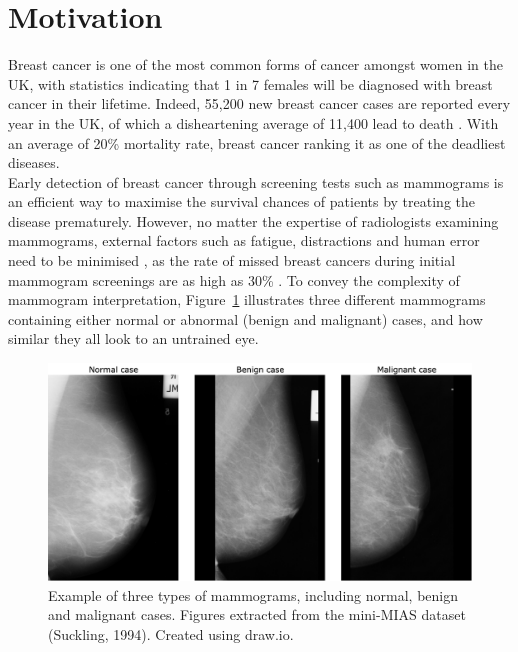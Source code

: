 \section{Motivation}

Breast cancer is one of the most common forms of cancer amongst women in the UK, with statistics indicating that 1 in 7 females will be diagnosed with breast cancer in their lifetime. Indeed, 55,200 new breast cancer cases are reported every year in the UK, of which a disheartening average of 11,400 lead to death \citep{BreastCancerResearchUK}. With an average of 20\% mortality rate, breast cancer ranking it as one of the deadliest diseases.\\

Early detection of breast cancer through screening tests such as mammograms is an efficient way to maximise the survival chances of patients by treating the disease prematurely. However, no matter the expertise of radiologists examining mammograms, external factors such as fatigue, distractions and human error need to be minimised \citep{Polat2007}, as the rate of missed breast cancers during initial mammogram screenings  are as high as 30\% \citep{Elter2009}. To convey the complexity of mammogram interpretation, Figure~\ref{fig:introduction-mammogram-examples} illustrates three different mammograms containing either normal or abnormal (benign and malignant) cases, and how similar they all look to an untrained eye.\\

\begin{figure}[ht]
\centerline{\includegraphics[width=\textwidth]{figures/introduction/mammogram examples.png}}
\caption{\label{fig:introduction-mammogram-examples}Example of three types of mammograms, including normal, benign and malignant cases. Figures extracted from the mini-MIAS dataset (Suckling, 1994). Created using draw.io.}
\end{figure}

